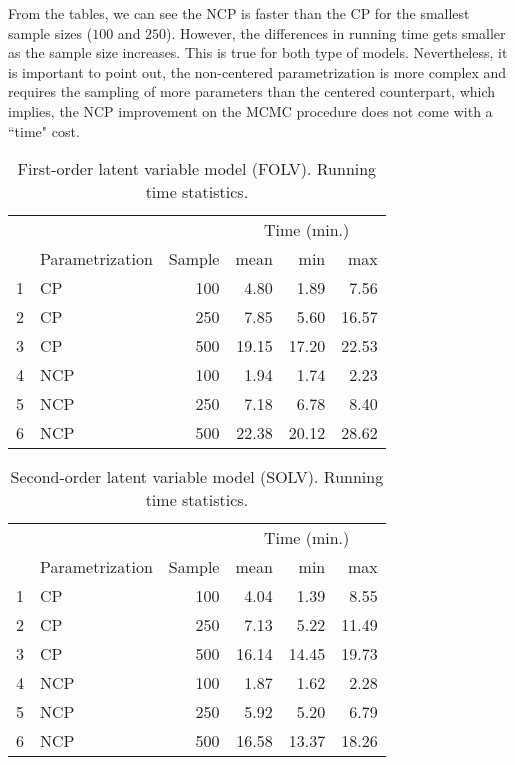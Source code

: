 From the tables, we can see the NCP is faster than the CP for the smallest sample sizes ($100$ and $250$).  However, the differences in running time gets smaller as the sample size increases. This is true for both type of models. Nevertheless, it is important to point out, the non-centered parametrization is more complex and requires the sampling of more parameters than the centered counterpart, which implies, the NCP improvement on the MCMC procedure does not come with a ``time" cost.
%
\begin{table}[H]
	\centering
	\begin{tabular}{rlrrrr}
		\hline
		\multicolumn{3}{c}{ }& \multicolumn{3}{c}{ Time (min.) } \\ 
		\cmidrule(rl){4-6} 
		& Parametrization & Sample & mean & min & max \\ 
		\hline\hline
		1 & CP & 100 & 4.80 & 1.89 & 7.56 \\ 
		2 & CP & 250 & 7.85 & 5.60 & 16.57 \\ 
		3 & CP & 500 & 19.15 & 17.20 & 22.53 \\ 
		4 & NCP & 100 & 1.94 & 1.74 & 2.23 \\ 
		5 & NCP & 250 & 7.18 & 6.78 & 8.40 \\ 
		6 & NCP & 500 & 22.38 & 20.12 & 28.62 \\
		\hline
	\end{tabular}
	\caption[First-order latent variable model (FOLV). Running time statistics.]%
	{First-order latent variable model (FOLV). Running time statistics.} 
	\label{tab:FOLV_time}
\end{table}
%
\begin{table}[H]
	\centering
	\begin{tabular}{rlrrrr}
		\hline
		\multicolumn{3}{c}{ }& \multicolumn{3}{c}{ Time (min.) } \\ 
		\cmidrule(rl){4-6} 
		& Parametrization & Sample & mean & min & max \\ 
		\hline\hline
		1 & CP & 100 & 4.04 & 1.39 & 8.55 \\ 
		2 & CP & 250 & 7.13 & 5.22 & 11.49 \\ 
		3 & CP & 500 & 16.14 & 14.45 & 19.73 \\ 
		4 & NCP & 100 & 1.87 & 1.62 & 2.28 \\ 
		5 & NCP & 250 & 5.92 & 5.20 & 6.79 \\ 
		6 & NCP & 500 & 16.58 & 13.37 & 18.26 \\
		\hline
	\end{tabular}
	\caption[Second-order latent variable model (SOLV). Running time statistics.]%
	{Second-order latent variable model (SOLV). Running time statistics.} 
	\label{tab:SOLV_time}
\end{table}
